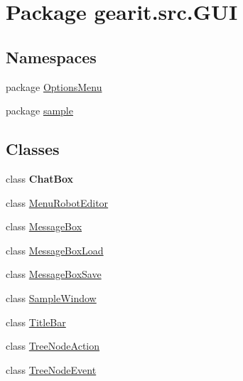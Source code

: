 \hypertarget{namespacegearit_1_1src_1_1_g_u_i}{\section{Package gearit.\+src.\+G\+U\+I}
\label{namespacegearit_1_1src_1_1_g_u_i}
}
\subsection*{Namespaces}
\begin{DoxyCompactItemize}
\item 
package \hyperlink{namespacegearit_1_1src_1_1_g_u_i_1_1_options_menu}{Options\+Menu}
\item 
package \hyperlink{namespacegearit_1_1src_1_1_g_u_i_1_1sample}{sample}
\end{DoxyCompactItemize}
\subsection*{Classes}
\begin{DoxyCompactItemize}
\item 
class {\bfseries Chat\+Box}
\item 
class \hyperlink{classgearit_1_1src_1_1_g_u_i_1_1_menu_robot_editor}{Menu\+Robot\+Editor}
\item 
class \hyperlink{classgearit_1_1src_1_1_g_u_i_1_1_message_box}{Message\+Box}
\item 
class \hyperlink{classgearit_1_1src_1_1_g_u_i_1_1_message_box_load}{Message\+Box\+Load}
\item 
class \hyperlink{classgearit_1_1src_1_1_g_u_i_1_1_message_box_save}{Message\+Box\+Save}
\item 
class \hyperlink{classgearit_1_1src_1_1_g_u_i_1_1_sample_window}{Sample\+Window}
\item 
class \hyperlink{classgearit_1_1src_1_1_g_u_i_1_1_title_bar}{Title\+Bar}
\item 
class \hyperlink{classgearit_1_1src_1_1_g_u_i_1_1_tree_node_action}{Tree\+Node\+Action}
\item 
class \hyperlink{classgearit_1_1src_1_1_g_u_i_1_1_tree_node_event}{Tree\+Node\+Event}
\end{DoxyCompactItemize}
